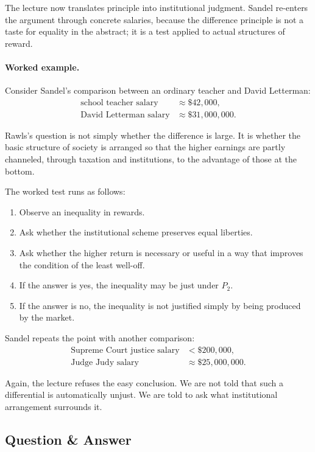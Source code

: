 The lecture now translates principle into institutional judgment. Sandel re-enters the argument through concrete salaries, because the difference principle is not a taste for equality in the abstract; it is a test applied to actual structures of reward.

\paragraph{Worked example.} Consider Sandel's comparison between an ordinary teacher and David Letterman:
\begin{align}
\text{school teacher salary} &\approx \$42{,}000,\\
\text{David Letterman salary} &\approx \$31{,}000{,}000.
\end{align}

Rawls's question is not simply whether the difference is large. It is whether the basic structure of society is arranged so that the higher earnings are partly channeled, through taxation and institutions, to the advantage of those at the bottom.

The worked test runs as follows:
\begin{enumerate}
\item Observe an inequality in rewards.
\item Ask whether the institutional scheme preserves equal liberties.
\item Ask whether the higher return is necessary or useful in a way that improves the condition of the least well-off.
\item If the answer is yes, the inequality may be just under \(P_2\).
\item If the answer is no, the inequality is not justified simply by being produced by the market.
\end{enumerate}

Sandel repeats the point with another comparison:
\begin{align}
\text{Supreme Court justice salary} &< \$200{,}000,\\
\text{Judge Judy salary} &\approx \$25{,}000{,}000.
\end{align}

Again, the lecture refuses the easy conclusion. We are not told that such a differential is automatically unjust. We are told to ask what institutional arrangement surrounds it.

\subsection{Question \& Answer}

